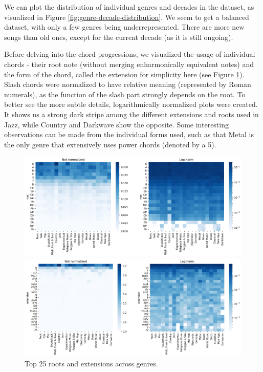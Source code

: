 \documentclass{article}
\begin{document}
We can plot the distribution of individual genres and decades in the dataset, as visualized in Figure \ref{fig:genre-decade-distribution}. We seem to get a balanced dataset, with only a few genres being underrepresented. There are more new songs than old ones, except for the current decade (as it is still ongoing).

Before delving into the chord progressions, we visualized the usage of individual chords - their root note (without merging enharmonically equivalent notes) and the form of the chord, called the extension for simplicity here (see Figure \ref{fig:roots-extensions-across-genres}). Slash chords were normalized to have relative meaning (represented by Roman numerals), as the function of the slash part strongly depends on the root. To better see the more subtle details, logarithmically normalized plots were created. It shows us a strong dark stripe among the different extensions and roots used in Jazz, while Country and Darkwave show the opposite. Some interesting observations can be made from the individual forms used, such as that Metal is the only genre that extensively uses power chords (denoted by a 5).

\begin{figure}[!htbp]
    \centering
    \begin{minipage}{\textwidth}
        \centering
        \includegraphics[width=\linewidth]{images/roots-across-genres.png}
    \end{minipage}\hfill
    \begin{minipage}{\textwidth}
        \centering
        \includegraphics[width=\linewidth]{images/extensions-across-genres.png}
    \end{minipage}
    \caption{Top 25 roots and extensions across genres.}
    \label{fig:roots-extensions-across-genres}
\end{figure}
\end{document}
